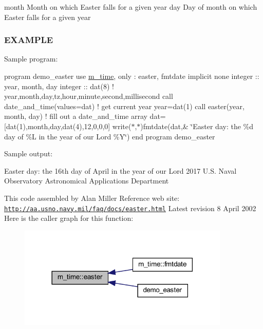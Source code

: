 month Month on which Easter falls for a given year day Day of month on which Easter falls for a given year

\subsubsection*{E\+X\+A\+M\+P\+LE}

Sample program\+:

program demo\+\_\+easter use \hyperlink{namespacem__time}{m\+\_\+time}, only \+: easter, fmtdate implicit none integer \+:\+: year, month, day integer \+:\+: dat(8) ! year,month,day,tz,hour,minute,second,millisecond call date\+\_\+and\+\_\+time(values=dat) ! get current year year=dat(1) call easter(year, month, day) ! fill out a date\+\_\+and\+\_\+time array dat=\mbox{[}dat(1),month,day,dat(4),12,0,0,0\mbox{]} write($\ast$,$\ast$)fmtdate(dat,\& \char`\"{}\+Easter day\+: the \%d day of \%\+L in the year of our Lord \%\+Y\char`\"{}) end program demo\+\_\+easter

Sample output\+:

Easter day\+: the 16th day of April in the year of our Lord 2017 U.\+S. Naval Observatory Astronomical Applications Department

This code assembled by Alan Miller Reference web site\+: \href{http://aa.usno.navy.mil/faq/docs/easter.html}{\tt http\+://aa.\+usno.\+navy.\+mil/faq/docs/easter.\+html} Latest revision 8 April 2002 Here is the caller graph for this function\+:
\nopagebreak
\begin{figure}[H]
\begin{center}
\leavevmode
\includegraphics[width=285pt]{namespacem__time_af3c98ac7124f9fe2584cc76688b00094_icgraph}
\end{center}
\end{figure}
\mbox{\label{namespacem__time_a915b29d3b8abeeb7455eb5d6eed28790}} 
